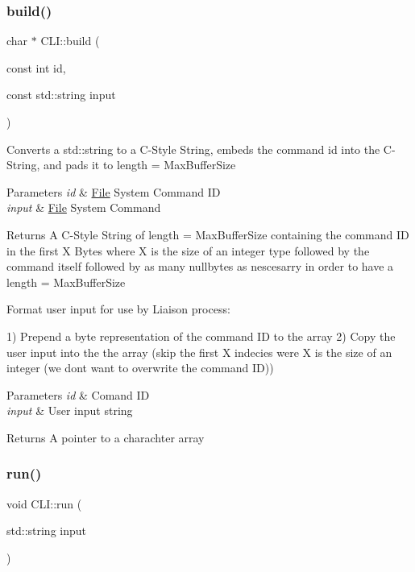 \subsubsection{\texorpdfstring{build()}{build()}}
{\footnotesize\ttfamily char $\ast$ C\+L\+I\+::build (\begin{DoxyParamCaption}\item[{const int}]{id,  }\item[{const std\+::string}]{input }\end{DoxyParamCaption})}

Converts a std\+::string to a C-\/\+Style String, embeds the command id into the C-\/\+String, and pads it to length = Max\+Buffer\+Size


\begin{DoxyParams}{Parameters}
{\em id} & \mbox{\hyperlink{classFile}{File}} System Command ID\\
\hline
{\em input} & \mbox{\hyperlink{classFile}{File}} System Command\\
\hline
\end{DoxyParams}
\begin{DoxyReturn}{Returns}
A C-\/\+Style String of length = Max\+Buffer\+Size containing the command ID in the first X Bytes where X is the size of an integer type followed by the command itself followed by as many nullbytes as nescesarry in order to have a length = Max\+Buffer\+Size
\end{DoxyReturn}
Format user input for use by Liaison process\+:

1) Prepend a byte representation of the command ID to the array 2) Copy the user input into the the array (skip the first X indecies were X is the size of an integer (we don\textquotesingle{}t want to overwrite the command ID))


\begin{DoxyParams}{Parameters}
{\em id} & Comand ID \\
\hline
{\em input} & User input string \\
\hline
\end{DoxyParams}
\begin{DoxyReturn}{Returns}
A pointer to a charachter array 
\end{DoxyReturn}
\mbox{\label{classCLI_a5ce3ce0818fc0afe2a277995000ea22b}} 
\subsubsection{\texorpdfstring{run()}{run()}\hspace{0.1cm}{\footnotesize\ttfamily [1/2]}}
{\footnotesize\ttfamily void C\+L\+I\+::run (\begin{DoxyParamCaption}\item[{std\+::string}]{input }\end{DoxyParamCaption})}

